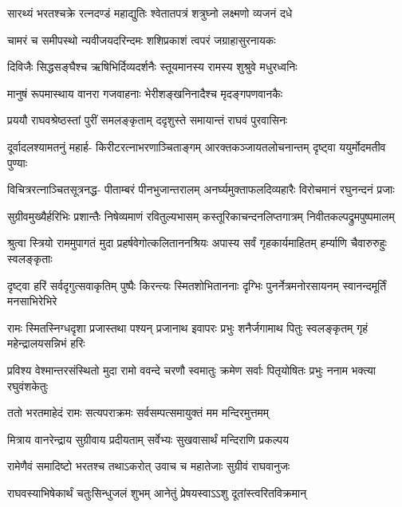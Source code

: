 \twolineshloka
{सारथ्यं भरतश्चक्रे रत्नदण्डं महाद्युतिः}
{श्वेतातपत्रं शत्रुघ्नो लक्ष्मणो व्यजनं दधे} %

\twolineshloka
{चामरं च समीपस्थो न्यवीजयदरिन्दमः}
{शशिप्रकाशं त्वपरं जग्राहासुरनायकः} %

\twolineshloka
{दिविजैः सिद्धसङ्घैश्च ऋषिभिर्दिव्यदर्शनैः}
{स्तूयमानस्य रामस्य शुश्रुवे मधुरध्वनिः} %

\twolineshloka
{मानुषं रूपमास्थाय वानरा गजवाहनाः}
{भेरीशङ्खनिनादैश्च मृदङ्गपणवानकैः} %

\twolineshloka
{प्रययौ राघवश्रेष्ठस्तां पुरीं समलङ्कृताम्}
{ददृशुस्ते समायान्तं राघवं पुरवासिनः} %

\fourlineindentedshloka
{दूर्वादलश्यामतनुं महार्ह-}
{किरीटरत्नाभरणाञ्चिताङ्गम्}
{आरक्तकञ्जायतलोचनान्तम्}
{दृष्ट्वा ययुर्मोदमतीव पुण्याः} %

\fourlineindentedshloka
{विचित्ररत्नाञ्चितसूत्रनद्ध-}
{पीताम्बरं पीनभुजान्तरालम्}
{अनर्घ्यमुक्ताफलदिव्यहारैः}
{विरोचमानं रघुनन्दनं प्रजाः} %

\fourlineindentedshloka
{सुग्रीवमुख्यैर्हरिभिः प्रशान्तैः}
{निषेव्यमाणं रवितुल्यभासम्}
{कस्तूरिकाचन्दनलिप्तगात्रम्}
{निवीतकल्पद्रुमपुष्पमालम्} %

\fourlineindentedshloka
{श्रुत्वा स्त्रियो राममुपागतं मुदा}
{प्रहर्षवेगोत्कलिताननश्रियः}
{अपास्य सर्वं गृहकार्यमाहितम्}
{हर्म्याणि चैवारुरुहुः स्वलङ्कृताः} %

\fourlineindentedshloka
{दृष्ट्वा हरिं सर्वदृगुत्सवाकृतिम्}
{पुष्पैः किरन्त्यः स्मितशोभिताननाः}
{दृग्भिः पुनर्नेत्रमनोरसायनम्}
{स्वानन्दमूर्तिं मनसाभिरेभिरे} %

\fourlineindentedshloka
{रामः स्मितस्निग्धदृशा प्रजास्तथा}
{पश्यन् प्रजानाथ इवापरः प्रभुः}
{शनैर्जगामाथ पितुः स्वलङ्कृतम्}
{गृहं महेन्द्रालयसन्निभं हरिः} %

\fourlineindentedshloka
{प्रविश्य वेश्मान्तरसंस्थितो मुदा}
{रामो ववन्दे चरणौ स्वमातुः}
{क्रमेण सर्वाः पितृयोषितः प्रभुः}
{ननाम भक्त्या रघुवंशकेतुः} %

\twolineshloka
{ततो भरतमाहेदं रामः सत्यपराक्रमः}
{सर्वसम्पत्समायुक्तं मम मन्दिरमुत्तमम्} %

\twolineshloka
{मित्राय वानरेन्द्राय सुग्रीवाय प्रदीयताम्}
{सर्वेभ्यः सुखवासार्थं मन्दिराणि प्रकल्पय} %

\twolineshloka
{रामेणैवं समादिष्टो भरतश्च तथाऽकरोत्}
{उवाच च महातेजाः सुग्रीवं राघवानुजः} %

\twolineshloka
{राघवस्याभिषेकार्थं चतुःसिन्धुजलं शुभम्}
{आनेतुं प्रेषयस्वाऽऽशु दूतांस्त्वरितविक्रमान्} %


